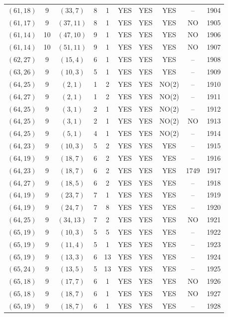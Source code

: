 \begin{longtable}{|c|c|c|c|c|c|c|c|c|c|}
$(61, 18)$ & 9 & $(33, 7)$ & 8 & 1 & YES & YES & YES & -- & 1904\\
$(61, 17)$ & 9 & $(37, 11)$ & 8 & 1 & YES & YES & YES & NO & 1905\\
$(61, 14)$ & 10 & $(47, 10)$ & 9 & 1 & YES & YES & YES & NO & 1906\\
$(61, 14)$ & 10 & $(51, 11)$ & 9 & 1 & YES & YES & YES & NO & 1907\\
$(62, 27)$ & 9 & $(15, 4)$ & 6 & 1 & YES & YES & YES & -- & 1908\\
$(63, 26)$ & 9 & $(10, 3)$ & 5 & 1 & YES & YES & YES & -- & 1909\\
$(64, 25)$ & 9 & $(2, 1)$ & 1 & 2 & YES & YES & NO(2) & -- & 1910\\
$(64, 27)$ & 9 & $(2, 1)$ & 1 & 2 & YES & YES & NO(2) & -- & 1911\\
$(64, 25)$ & 9 & $(3, 1)$ & 2 & 1 & YES & YES & NO(2) & -- & 1912\\
$(64, 25)$ & 9 & $(3, 1)$ & 2 & 1 & YES & YES & NO(2) & NO & 1913\\
$(64, 25)$ & 9 & $(5, 1)$ & 4 & 1 & YES & YES & NO(2) & -- & 1914\\
$(64, 23)$ & 9 & $(10, 3)$ & 5 & 2 & YES & YES & YES & -- & 1915\\
$(64, 19)$ & 9 & $(18, 7)$ & 6 & 2 & YES & YES & YES & -- & 1916\\
$(64, 23)$ & 9 & $(18, 7)$ & 6 & 2 & YES & YES & YES & 1749 & 1917\\
$(64, 27)$ & 9 & $(18, 5)$ & 6 & 2 & YES & YES & YES & -- & 1918\\
$(64, 19)$ & 9 & $(23, 7)$ & 7 & 1 & YES & YES & YES & -- & 1919\\
$(64, 19)$ & 9 & $(24, 7)$ & 7 & 8 & YES & YES & YES & -- & 1920\\
$(64, 25)$ & 9 & $(34, 13)$ & 7 & 2 & YES & YES & YES & NO & 1921\\
$(65, 19)$ & 9 & $(10, 3)$ & 5 & 5 & YES & YES & YES & -- & 1922\\
$(65, 19)$ & 9 & $(11, 4)$ & 5 & 1 & YES & YES & YES & -- & 1923\\
$(65, 19)$ & 9 & $(13, 3)$ & 6 & 13 & YES & YES & YES & -- & 1924\\
$(65, 24)$ & 9 & $(13, 5)$ & 5 & 13 & YES & YES & YES & -- & 1925\\
$(65, 18)$ & 9 & $(17, 7)$ & 6 & 1 & YES & YES & YES & NO & 1926\\
$(65, 18)$ & 9 & $(18, 7)$ & 6 & 1 & YES & YES & YES & NO & 1927\\
$(65, 19)$ & 9 & $(18, 7)$ & 6 & 1 & YES & YES & YES & -- & 1928\\

\end{longtable}
